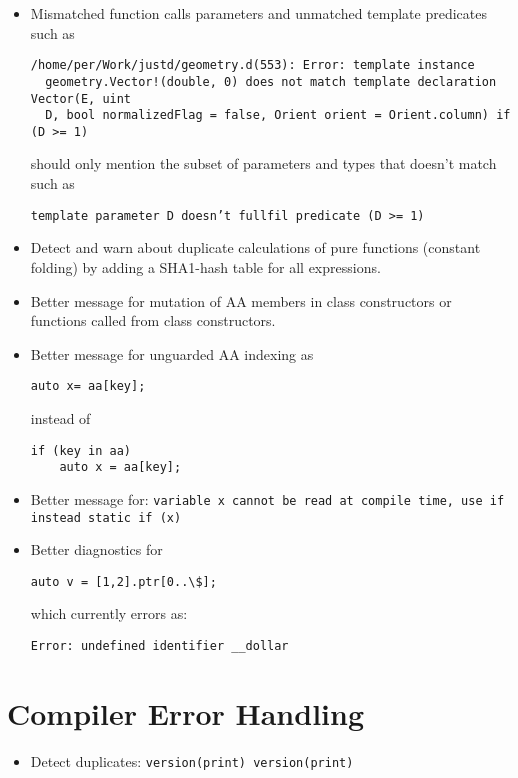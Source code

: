 \documentclass[xcolor=dvipsnames, twocolumn]{article}
\begin{document}
\begin{itemize}

\item Mismatched function calls parameters and unmatched template predicates such as

\begin{lstlisting}[frame=single]
/home/per/Work/justd/geometry.d(553): Error: template instance
  geometry.Vector!(double, 0) does not match template declaration Vector(E, uint
  D, bool normalizedFlag = false, Orient orient = Orient.column) if (D >= 1)
\end{lstlisting}

should only mention the subset of parameters and types that doesn't match such as

\begin{lstlisting}[frame=single]
template parameter D doesn’t fullfil predicate (D >= 1)
\end{lstlisting}

\item Detect and warn about duplicate calculations of pure functions (constant
  folding) by adding a SHA1-hash table for all expressions.
\item Better message for mutation of AA members in class constructors or
  functions called from class constructors.

\item Better message for unguarded AA indexing as
\begin{lstlisting}[frame=single]
auto x= aa[key];
\end{lstlisting}
instead of
\begin{lstlisting}[frame=single]
if (key in aa)
    auto x = aa[key];
\end{lstlisting}

\item Better message for:
\texttt{variable x cannot be read at compile time, use if instead static if (x)}

\item Better diagnostics for
\begin{lstlisting}[frame=single]
auto v = [1,2].ptr[0..\$];
\end{lstlisting}
which currently errors as:
\begin{lstlisting}[frame=single]
Error: undefined identifier __dollar
\end{lstlisting}

\end{itemize}

\section{Compiler Error Handling}
\begin{itemize}
\item Detect duplicates: \texttt{version(print) version(print)}
\end{itemize}
\end{document}
